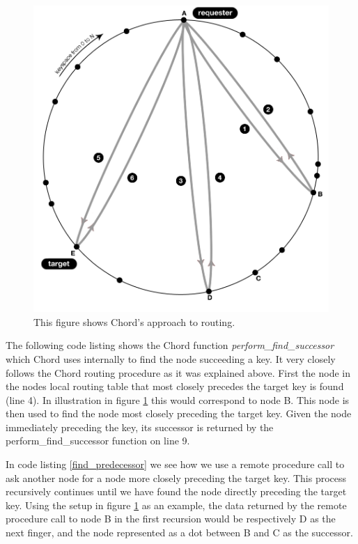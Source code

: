 \begin{figure}[!htb]
\begin{center}
	\includegraphics[width=0.9\linewidth]{illustrations/ChordRoutingSuccess.png}
  \caption{This figure shows Chord's approach to routing.}
  \label{figRoutingChord}
\end{center}
\end{figure}

The following code listing shows the Chord function \emph{perform\_find\_successor} which Chord uses internally to find the node succeeding a key. 
It very closely follows the Chord routing procedure as it was explained above. 
First the node in the nodes local routing table that most closely precedes the target key is found (line 4). In illustration in figure \ref{figRoutingChord} this would correspond to node B. This node is then used to find the node most closely preceding the target key. Given the node immediately preceding the key, its successor is returned by the perform\_find\_successor function on line 9.



In code listing \ref{find_predecessor} we see how we use a remote procedure call to ask another node for a node more closely preceding the target key. This process recursively continues until we have found the node directly preceding the target key.
Using the setup in figure \ref{figRoutingChord} as an example, the data returned by the remote procedure call to node B in the first recursion would be respectively D as the next finger, and the node represented as a dot between B and C as the successor. 

